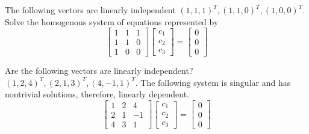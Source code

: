 


	
	
 




\begin{example}
	The following vectors are linearly independent $(1, 1, 1)^T, (1, 1, 0)^T, (1, 0, 0)^T$.  Solve the homogenous system of equations represented by 
	\[  \begin{bmatrix}  1	& 1	& 1\\ 1 & 1  &  0\\ 1  &  0  &  0   \end{bmatrix} \begin{bmatrix} c_1 \\ c_2  \\ c_3   \end{bmatrix}  = \begin{bmatrix}  0 \\ 0 \\  0  \end{bmatrix} \]
	
\end{example}







\begin{example}
	Are the following vectors are linearly independent?   $(1, 2, 4)^T, (2, 1, 3)^T, (4, -1, 1)^T$.  The following system is singular and has nontrivial solutions, therefore, linearly dependent.
	\[  \begin{bmatrix}  1	& 2	& 4\\ 2 & 1  &  -1\\ 4  &  3  &  1   \end{bmatrix} \begin{bmatrix} c_1 \\ c_2  \\ c_3   \end{bmatrix}  = \begin{bmatrix}  0 \\ 0 \\  0  \end{bmatrix} \]
	
\end{example}








